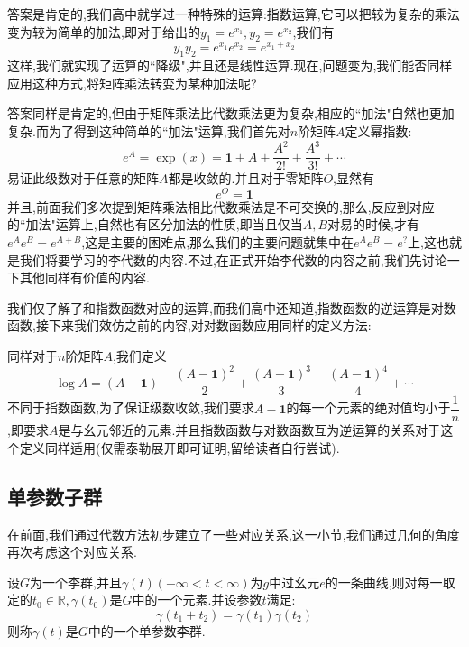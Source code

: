 答案是肯定的,我们高中就学过一种特殊的运算:指数运算,它可以把较为复杂的乘法变为较为简单的加法,即对于给出的$y_1=e^{x_1},y_2=e^{x_2}$,我们有
\begin{equation}
    y_1y_2=e^{x_1}e^{x_2}=e^{x_1+x_2}
\end{equation}
这样,我们就实现了运算的``降级",并且还是线性运算.现在,问题变为,我们能否同样应用这种方式,将矩阵乘法转变为某种加法呢?

答案同样是肯定的,但由于矩阵乘法比代数乘法更为复杂,相应的``加法"自然也更加复杂.而为了得到这种简单的``加法"运算,我们首先对$n$阶矩阵$A$定义幂指数:
\begin{equation}
    e^A=\exp(x)=\textbf{1}+A+\frac{A^2}{2!}+\frac{A^3}{3!}+\cdots 
\end{equation}
易证此级数对于任意的矩阵$A$都是收敛的.并且对于零矩阵$O$,显然有
\begin{equation}
    e^O=\textbf{1}
\end{equation}
并且,前面我们多次提到矩阵乘法相比代数乘法是不可交换的,那么,反应到对应的``加法"运算上,自然也有区分加法的性质,即当且仅当$A,B$对易的时候,才有$e^Ae^B=e^{A+B}$,这是主要的困难点,那么我们的主要问题就集中在$e^Ae^B=e^{?}$上,这也就是我们将要学习的李代数的内容.不过,在正式开始李代数的内容之前,我们先讨论一下其他同样有价值的内容.

我们仅了解了和指数函数对应的运算,而我们高中还知道,指数函数的逆运算是对数函数,接下来我们效仿之前的内容,对对数函数应用同样的定义方法:

同样对于$n$阶矩阵$A$,我们定义
\begin{equation}
    \log A=(A-\textbf{1})-\frac{(A-\textbf{1})^2}2+\frac{(A-\textbf{1})^3}3-\frac{(A-\textbf{1})^4}4+\cdots 
\end{equation}
不同于指数函数,为了保证级数收敛,我们要求$A-\textbf{1}$的每一个元素的绝对值均小于$\dfrac{1}{n}$,即要求$A$是与幺元邻近的元素.并且指数函数与对数函数互为逆运算的关系对于这个定义同样适用(仅需泰勒展开即可证明,留给读者自行尝试).
\subsection{单参数子群}
在前面,我们通过代数方法初步建立了一些对应关系,这一小节,我们通过几何的角度再次考虑这个对应关系.

\begin{definition}[单参数子群]
    设$G$为一个李群,并且$\gamma(t)(-\infty<t<\infty)$为$g$中过幺元$e$的一条曲线,则对每一取定的$t_0\in \mathbb{R},\gamma(t_0)$是$G$中的一个元素.并设参数$t$满足:
    \begin{equation}
        \gamma(t_1+t_2)=\gamma(t_1)\gamma(t_2)
    \end{equation}
    则称$\gamma(t)$是$G$中的一个单参数李群.
\end{definition}

